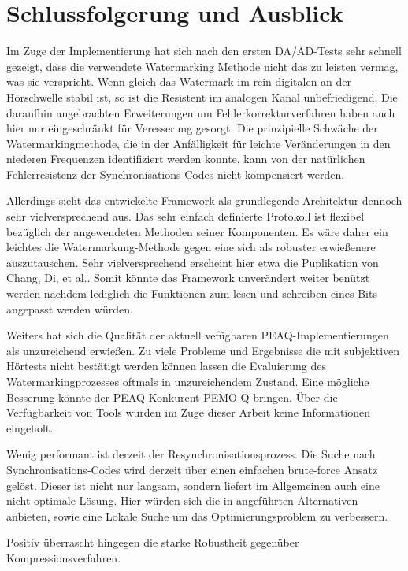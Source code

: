 \chapter{Schlussfolgerung und Ausblick}
\label{ch:ausblick}

Im Zuge der Implementierung hat sich nach den ersten DA/AD-Tests sehr schnell gezeigt, dass die verwendete Watermarking Methode\cite{xiang2007robust} nicht das zu leisten vermag, was sie verspricht. Wenn gleich das Watermark im rein digitalen an der Hörschwelle stabil ist, so ist die Resistent im analogen Kanal unbefriedigend. Die daraufhin angebrachten Erweiterungen um Fehlerkorrekturverfahren haben auch hier nur eingeschränkt für Veresserung gesorgt. Die prinzipielle Schwäche der Watermarkingmethode, die in der Anfälligkeit für leichte Veränderungen in den niederen Frequenzen identifiziert werden konnte, kann von der natürlichen Fehlerresistenz der Synchronisations-Codes nicht kompensiert werden.

Allerdings sieht das entwickelte Framework als grundlegende Architektur dennoch sehr vielversprechend aus. Das sehr einfach definierte Protokoll ist flexibel bezüglich der angewendeten Methoden seiner Komponenten. Es wäre daher ein leichtes die Watermarkung-Methode gegen eine sich als robuster erwießenere auszutauschen. Sehr vielversprechend erscheint hier etwa die Puplikation von Chang, Di, et al.\cite{chang2012location}. Somit könnte das Framework unverändert weiter benützt werden nachdem lediglich die Funktionen zum lesen und schreiben eines Bits angepasst werden würden. 

Weiters hat sich die Qualität der aktuell vefügbaren PEAQ-Implementierungen als unzureichend erwießen. Zu viele Probleme und Ergebnisse die mit subjektiven Hörtests nicht bestätigt werden können lassen die Evaluierung des Watermarkingprozesses oftmals in unzureichendem Zustand. Eine mögliche Besserung könnte der PEAQ Konkurent PEMO-Q\cite{huber2006pemo} bringen. Über die Verfügbarkeit von Tools wurden im Zuge dieser Arbeit keine Informationen eingeholt. 

Wenig performant ist derzeit der Re\-synchron\-isations\-prozess. Die Suche nach Synchron\-isations-Codes wird derzeit über einen einfachen brute-force Ansatz gelöst. Dieser ist nicht nur langsam, sondern liefert im Allgemeinen auch eine nicht optimale Lösung. Hier würden sich die in \cite{steinebach2011re} angeführten Alternativen anbieten, sowie eine Lokale Suche um das Optimierungs\-problem zu verbessern. 

Positiv überrascht hingegen die starke Robustheit gegenüber Kompressionsverfahren.